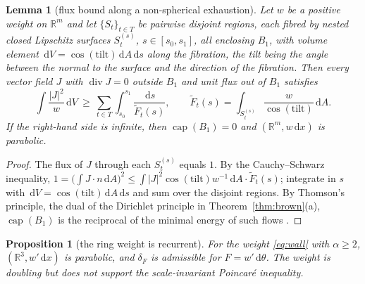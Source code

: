 \documentclass[11pt]{amsart}
\newcommand{\R}{\mathbb{R}}
\newcommand{\dd}{\,\mathrm{d}}
\newcommand{\abs}[1]{\lvert #1\rvert}
\DeclareMathOperator{\capa}{cap}
\DeclareMathOperator{\divg}{div}
\theoremstyle{plain}
\newtheorem{proposition}[theorem]{Proposition}
\newtheorem{lemma}[theorem]{Lemma}
\theoremstyle{definition}
\theoremstyle{remark}
\begin{document}
\begin{lemma}[flux bound along a non-spherical exhaustion]\label{lem:thomson}
Let $w$ be a positive weight on $\R^m$ and let $\{S_t\}_{t\in T}$ be pairwise
disjoint regions, each fibred by nested closed Lipschitz surfaces $S_t^{(s)}$,
$s\in[s_0,s_1]$, all enclosing $B_1$, with volume element
$\dd V=\cos(\mathrm{tilt})\dd A\dd s$ along the fibration, the tilt being the
angle between the normal to the surface and the direction of the fibration.
Then every vector
field $J$ with $\divg J=0$ outside $B_1$ and unit flux out of $B_1$ satisfies
\[
\int\frac{\abs J^2}{w}\dd V\ \ge\ \sum_{t\in T}\int_{s_0}^{s_1}\frac{\dd s}{\tilde F_t(s)},
\qquad \tilde F_t(s)=\int_{S_t^{(s)}}\frac{w}{\cos(\mathrm{tilt})}\dd A .
\]
If the right-hand side is infinite, then $\capa(B_1)=0$ and $(\R^m,w\dd x)$ is
parabolic.
\end{lemma}

\begin{proof}
The flux of $J$ through each $S_t^{(s)}$ equals $1$. By the Cauchy--Schwarz
inequality,
$1=\bigl(\int J\cdot n\dd A\bigr)^2\le\int\abs{J}^2\cos(\mathrm{tilt})w^{-1}\dd A
\cdot\tilde F_t(s)$; integrate in $s$ with $\dd V=\cos(\mathrm{tilt})\dd A\dd s$
and sum over the disjoint regions. By Thomson's principle, the dual of the
Dirichlet principle in Theorem~\ref{thm:brown}(a), $\capa(B_1)$ is the
reciprocal of the minimal energy of such flows \cite[\S7]{grigoryan1999}.
\end{proof}

\begin{proposition}[the ring weight is recurrent]\label{prop:wall}
For the weight \eqref{eq:wall} with $\alpha\ge2$, $(\R^3,w'\dd x)$ is parabolic,
and $\delta_F$ is admissible for $F=w'\dd\theta$. The weight is doubling but does
not support the scale-invariant Poincar\'e inequality.
\end{proposition}
\end{document}
